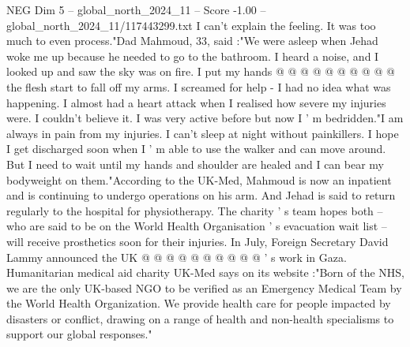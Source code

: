 \begin{textsample}{NEG Dim 5 – global\_north\_2024\_11 – Score -1.00 – global\_north\_2024\_11/117443299.txt}
I can't explain the feeling.
It was too much to even process."Dad Mahmoud, 33, said :"We were asleep when Jehad woke me up because he needed to go to the bathroom.
I heard a noise, and I looked up and saw the sky was on fire.
I put my hands @ @ @ @ @ @ @ @ @ @ the flesh start to fall off my arms.
I screamed for help - I had no idea what was happening.
I almost had a heart attack when I realised how severe my injuries were.
I couldn't believe it.
I was very active before but now I ' m bedridden."I am always in pain from my injuries.
I can't sleep at night without painkillers.
I hope I get discharged soon when I ' m able to use the walker and can move around.
But I need to wait until my hands and shoulder are healed and I can bear my bodyweight on them."According to the UK-Med, Mahmoud is now an inpatient and is continuing to undergo operations on his arm.
And Jehad is said to return regularly to the hospital for physiotherapy.
The charity ' s team hopes both -- who are said to be on the World Health Organisation ' s evacuation wait list -- will receive prosthetics soon for their injuries.
In July, Foreign Secretary David Lammy announced the UK @ @ @ @ @ @ @ @ @ @ ' s work in Gaza.
Humanitarian medical aid charity UK-Med says on its website :"Born of the NHS, we are the only UK-based NGO to be verified as an Emergency Medical Team by the World Health Organization.
We provide health care for people impacted by disasters or conflict, drawing on a range of health and non-health specialisms to support our global responses."

\end{textsample}
